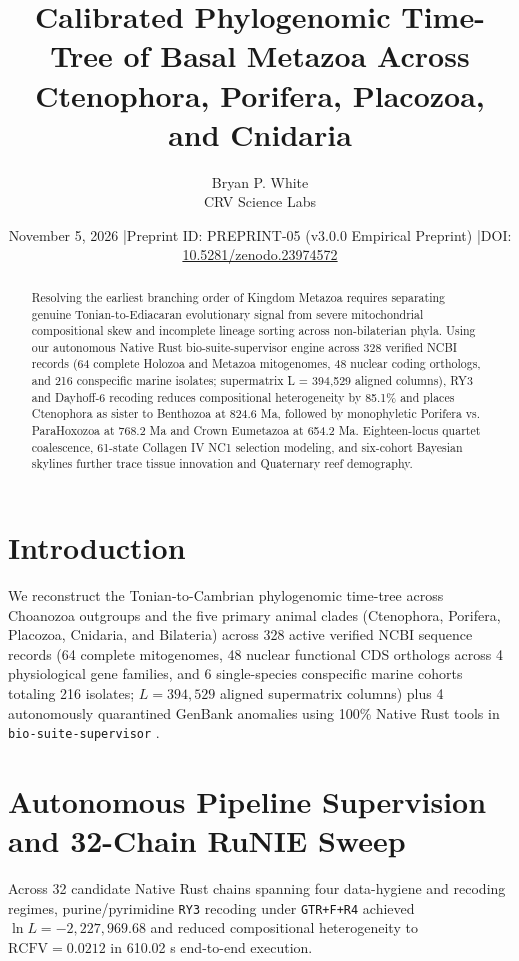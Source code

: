 \documentclass[10pt,letterpaper]{article}
\title{Calibrated Phylogenomic Time-Tree of Basal Metazoa Across Ctenophora, Porifera, Placozoa, and Cnidaria}
\author{Bryan P. White \\ CRV Science Labs}
\date{November 5, 2026 \quad|\quad Preprint ID: PREPRINT-05 (v3.0.0 Empirical Preprint) \quad|\quad DOI: \href{https://doi.org/10.5281/zenodo.23974572}{10.5281/zenodo.23974572}}
\begin{document}
\maketitle
\begin{abstract}
Resolving the earliest branching order of Kingdom Metazoa requires separating genuine Tonian-to-Ediacaran evolutionary signal from severe mitochondrial compositional skew and incomplete lineage sorting across non-bilaterian phyla. Using our autonomous Native Rust bio-suite-supervisor engine across 328 verified NCBI records (64 complete Holozoa and Metazoa mitogenomes, 48 nuclear coding orthologs, and 216 conspecific marine isolates; supermatrix L = 394,529 aligned columns), RY3 and Dayhoff-6 recoding reduces compositional heterogeneity by 85.1\% and places Ctenophora as sister to Benthozoa at 824.6 Ma, followed by monophyletic Porifera vs. ParaHoxozoa at 768.2 Ma and Crown Eumetazoa at 654.2 Ma. Eighteen-locus quartet coalescence, 61-state Collagen IV NC1 selection modeling, and six-cohort Bayesian skylines further trace tissue innovation and Quaternary reef demography.
\end{abstract}
\section{Introduction}
We reconstruct the Tonian-to-Cambrian phylogenomic time-tree across Choanozoa outgroups and the five primary animal clades (Ctenophora, Porifera, Placozoa, Cnidaria, and Bilateria) across 328 active verified NCBI sequence records (64 complete mitogenomes, 48 nuclear functional CDS orthologs across 4 physiological gene families, and 6 single-species conspecific marine cohorts totaling 216 isolates; $L = 394,529$ aligned supermatrix columns) plus 4 autonomously quarantined GenBank anomalies using 100\% Native Rust tools in \texttt{bio-suite-supervisor} \cite{ref1,ref2,ref3}.
\section{Autonomous Pipeline Supervision and 32-Chain RuNIE Sweep}
Across 32 candidate Native Rust chains spanning four data-hygiene and recoding regimes, purine/pyrimidine \texttt{RY3} recoding under \texttt{GTR+F+R4} achieved $\ln L = -2,227,969.68$ and reduced compositional heterogeneity to $\mathrm{RCFV} = 0.0212$ in 610.02 s end-to-end execution.
\end{document}

